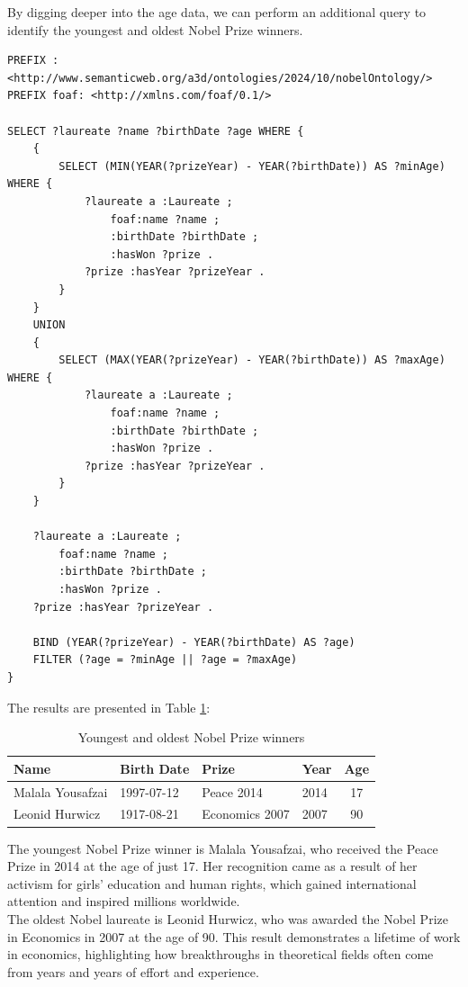 \documentclass{article}
\begin{document}
\newpage

\noindent By digging deeper into the age data, we can perform an additional query to identify the youngest and oldest
Nobel Prize winners.

\begin{lstlisting}
PREFIX : <http://www.semanticweb.org/a3d/ontologies/2024/10/nobelOntology/>
PREFIX foaf: <http://xmlns.com/foaf/0.1/>

SELECT ?laureate ?name ?birthDate ?age WHERE {
    {
        SELECT (MIN(YEAR(?prizeYear) - YEAR(?birthDate)) AS ?minAge) WHERE {
            ?laureate a :Laureate ;
                foaf:name ?name ;
                :birthDate ?birthDate ;
                :hasWon ?prize .
            ?prize :hasYear ?prizeYear .
        }
    }
    UNION
    {
        SELECT (MAX(YEAR(?prizeYear) - YEAR(?birthDate)) AS ?maxAge) WHERE {
            ?laureate a :Laureate ;
                foaf:name ?name ;
                :birthDate ?birthDate ;
                :hasWon ?prize .
            ?prize :hasYear ?prizeYear .
        }
    }

    ?laureate a :Laureate ;
        foaf:name ?name ;
        :birthDate ?birthDate ;
        :hasWon ?prize .
    ?prize :hasYear ?prizeYear .

    BIND (YEAR(?prizeYear) - YEAR(?birthDate) AS ?age)
    FILTER (?age = ?minAge || ?age = ?maxAge)
}
\end{lstlisting}

The results are presented in Table \ref{tab:youngest_oldest}:

\begin{table}[H]
	\centering
	\caption{Youngest and oldest Nobel Prize winners}
	\begin{tabular}{|l|l|l|l|c|}
		\hline
		\textbf{Name}    & \textbf{Birth Date} & \textbf{Prize} & \textbf{Year} & \textbf{Age} \\ \hline
		Malala Yousafzai & 1997-07-12          & Peace 2014     & 2014          & 17           \\ \hline
		Leonid Hurwicz   & 1917-08-21          & Economics 2007 & 2007          & 90           \\ \hline
	\end{tabular}
	\label{tab:youngest_oldest}
\end{table}

The youngest Nobel Prize winner is Malala Yousafzai, who received the Peace Prize in 2014 at the age of just 17.
Her recognition came as a result of her activism for girls' education and human rights, which gained international
attention and inspired millions worldwide.\\
The oldest Nobel laureate is Leonid Hurwicz, who was awarded the Nobel Prize in Economics in 2007 at the age of 90.
This result demonstrates a lifetime of work in economics, highlighting how breakthroughs in theoretical fields
often come from years and years of effort and experience.
\end{document}
